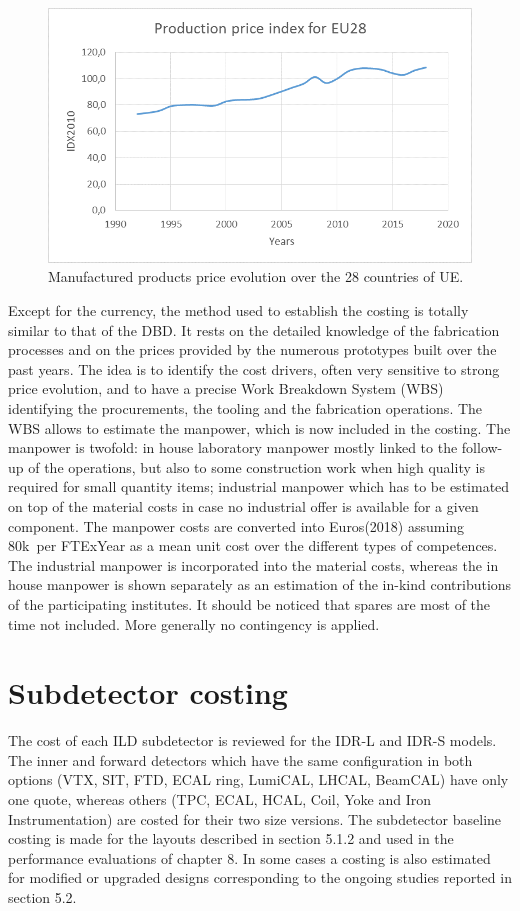 \begin{figure}[h!]
\centering
\includegraphics[width=1.0\hsize]{Costing/price_index.png}
\caption{Manufactured products price evolution over the 28 countries of UE.}
\label{price_index}
\end{figure}

Except for the currency, the method used to establish the costing is totally similar to that of the DBD. It rests on the detailed knowledge of the fabrication processes and on the prices provided by the numerous prototypes built over the past years.  The idea is to identify the cost drivers, often very sensitive to strong price evolution, and to have a precise Work Breakdown System (WBS) identifying the procurements, the tooling and the fabrication operations. The WBS allows to estimate the manpower, which is now included in the costing. The manpower is twofold: in house laboratory  manpower mostly linked to the follow-up of the operations, but also to some construction work when high quality is required for small quantity items; industrial manpower which has to be estimated on top of the material costs in case no industrial offer is available for a given component. The manpower costs are converted into Euros(2018) assuming 80k\texteuro~per FTExYear as a mean unit cost over the different types of competences. The industrial manpower is incorporated into the material costs, whereas the in house manpower is shown separately as an estimation of the in-kind contributions of the participating institutes. 
It should be noticed that spares are most of the time not included. More generally no contingency is applied.

\section{Subdetector costing}
The cost of each ILD subdetector is reviewed for the IDR-L and IDR-S models. The inner and forward detectors which have the same configuration in both options (VTX, SIT, FTD, ECAL ring, LumiCAL, LHCAL, BeamCAL) have only one quote, whereas others (TPC, ECAL, HCAL, Coil, Yoke and Iron Instrumentation) are costed for their two size versions. The subdetector baseline costing is made for the layouts described in section 5.1.2 and used in the performance evaluations of chapter 8. In some cases a costing is also estimated for modified or upgraded designs corresponding to the ongoing studies reported in section 5.2.   

